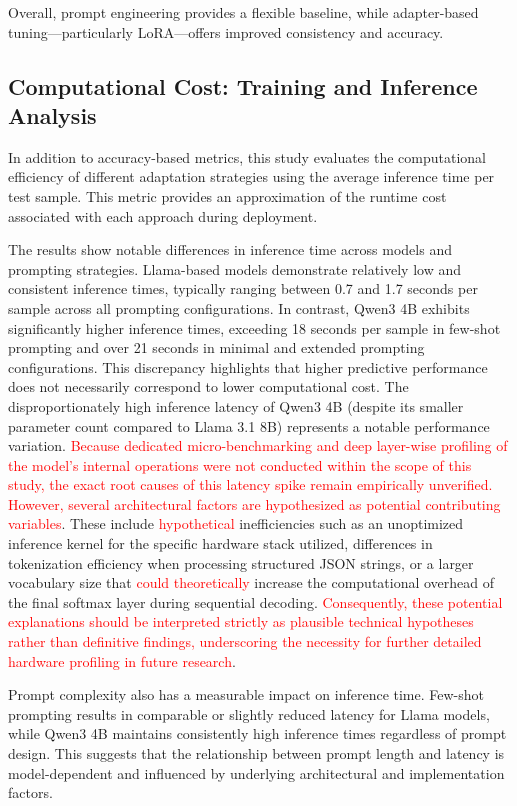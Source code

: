 \documentclass[journal,article,submit,pdftex,moreauthors]{Definitions/mdpi}
\begin{document}
Overall, prompt engineering provides a flexible baseline, while adapter-based tuning—particularly LoRA—offers improved consistency and accuracy.

\subsection{Computational Cost: Training and Inference Analysis}

In addition to accuracy-based metrics, this study evaluates the computational efficiency of different adaptation strategies using the average inference time per test sample. This metric provides an approximation of the runtime cost associated with each approach during deployment.

The results show notable differences in inference time across models and prompting strategies. Llama-based models demonstrate relatively low and consistent inference times, typically ranging between 0.7 and 1.7 seconds per sample across all prompting configurations. In contrast, Qwen3 4B exhibits significantly higher inference times, exceeding 18 seconds per sample in few-shot prompting and over 21 seconds in minimal and extended prompting configurations. This discrepancy highlights that higher predictive performance does not necessarily correspond to lower computational cost. The disproportionately high inference latency of Qwen3 4B (despite its smaller parameter count compared to Llama 3.1 8B) represents a notable performance variation. \textcolor{red}{Because dedicated micro-benchmarking and deep layer-wise profiling of the model's internal operations were not conducted within the scope of this study, the exact root causes of this latency spike remain empirically unverified. However, several architectural factors are hypothesized as potential contributing variables}. These include \textcolor{red}{hypothetical} inefficiencies such as an unoptimized inference kernel for the specific hardware stack utilized, differences in tokenization efficiency when processing structured JSON strings, or a larger vocabulary size that \textcolor{red}{could theoretically} increase the computational overhead of the final softmax layer during sequential decoding. \textcolor{red}{Consequently, these potential explanations should be interpreted strictly as plausible technical hypotheses rather than definitive findings, underscoring the necessity for further detailed hardware profiling in future research}.

Prompt complexity also has a measurable impact on inference time. Few-shot prompting results in comparable or slightly reduced latency for Llama models, while Qwen3 4B maintains consistently high inference times regardless of prompt design. This suggests that the relationship between prompt length and latency is model-dependent and influenced by underlying architectural and implementation factors.
\end{document}

